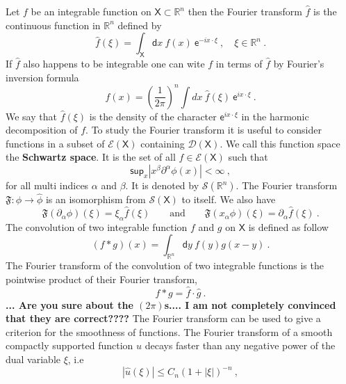\documentclass[11pt]{book}
\newcommand{\com}[1]{{\color{red}\bf #1}}
\renewcommand{\sup}{\mathsf{sup}}
\newcommand{\abs}[1]{\left|#1\right|}
\newcommand{\Dcal}{\mathcal{D}}
\newcommand{\Ecal}{\mathcal{E}}
\newcommand{\Scal}{\mathcal{S}}
\newcommand{\Rbb}{\mathbb{R}}
\newcommand{\Frak}{\mathfrak{F}}
\newcommand{\Xsf}{\mathsf{X}}
\newcommand{\dsf}{\mathsf{d}}
\newcommand{\esf}{\mathsf{e}}
\theoremstyle{break}
\begin{document}
Let $f$ be an integrable function on $\Xsf \subset \Rbb^n$ then the Fourier transform $\hat{f}$ is the continuous function in $\Rbb^n$ defined by
%
\begin{equation*}
\hat{f}(\xi) = \int_\Xsf \dsf x \ f(x) \ \esf^{-i x \cdot \xi} \ , \quad \xi \in \Rbb^n \ .
\end{equation*}
%
If $\hat{f}$ also happens to be integrable one can wite $f$ in terms of $\hat{f}$ by Fourier's inversion formula
%
\begin{equation*}
f(x) = \left(\frac{1}{2\pi}\right)^n \int dx \ \hat{f}(\xi) \ \esf^{i x \cdot \xi} \ .
\end{equation*}
%
We say that $\hat{f}(\xi)$ is the density of the character $\esf^{i x \cdot \xi}$ in the harmonic decomposition of $f$. To study the Fourier transform it is useful to consider functions in a subset of $\Ecal(\Xsf)$ containing $\Dcal(\Xsf)$. We call this function space the \textbf{Schwartz space}. It is the set of all $f \in \Ecal(\Xsf)$ such that 
%
\begin{equation*}
\sup_x \abs{x^\beta \partial^\alpha \phi(x)} < \infty \ ,
\end{equation*}
%
for all multi indices $\alpha$ and $\beta$. It is denoted by $\Scal(\Rbb^n)$. The Fourier transform $\Frak : \phi \to \hat{\phi}$ is an isomorphism from $\Scal(\Xsf)$ to itself. We also have 
%
\begin{equation*}
\Frak(\partial_\alpha \phi)(\xi) = \xi_\alpha \hat{f}(\xi) \qquad \mbox{and} \qquad \Frak(x_\alpha \phi)(\xi) = \partial_\alpha \hat{f}(\xi) \ .
\end{equation*}
%
The convolution of two integrable function $f$ and $g$ on $\Xsf$ is defined as follow
%
\begin{equation*}
( f \ast g )(x) = \int_{\Rbb^n} \dsf y \ f(y) g(x-y) \ .
\end{equation*}
%
The Fourier transform of the convolution of two integrable functions is the pointwise product of their Fourier transform,
%
\begin{equation*}
f \ast g = \hat{f} \cdot \hat{g} \ . 
\end{equation*}
\com{... Are you sure about the $(2\pi)$s.... I am not completely convinced that they are correct????}
%
The Fourier transform can be used to give a criterion for the smoothness of functions. The Fourier transform of a smooth compactly supported function $u$ decays faster than any negative power of the dual variable $\xi$, i.e
%
\begin{equation}
\abs{\hat{u}(\xi)} \leq C_n (1+\abs{\xi})^{-n} \ ,
\label{eq:crit_smooth_fourier}
\end{equation}
\end{document}
